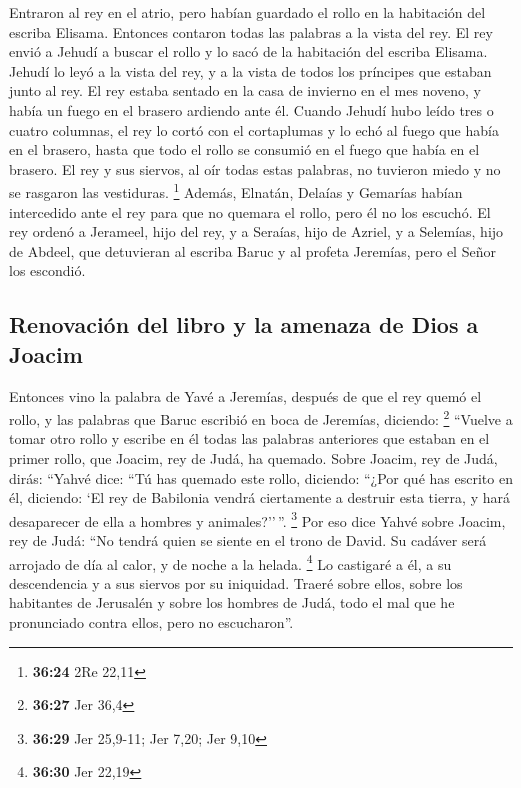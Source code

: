  Entraron al rey en el atrio, pero habían guardado el
rollo en la habitación del escriba Elisama. Entonces contaron todas las
palabras a la vista del rey.  El rey envió a Jehudí a
buscar el rollo y lo sacó de la habitación del escriba Elisama. Jehudí
lo leyó a la vista del rey, y a la vista de todos los príncipes que
estaban junto al rey.  El rey estaba sentado en la casa
de invierno en el mes noveno, y había un fuego en el brasero ardiendo
ante él.  Cuando Jehudí hubo leído tres o cuatro
columnas, el rey lo cortó con el cortaplumas y lo echó al fuego que
había en el brasero, hasta que todo el rollo se consumió en el fuego que
había en el brasero.  El rey y sus siervos, al oír todas
estas palabras, no tuvieron miedo y no se rasgaron las vestiduras.
\footnote{\textbf{36:24} 2Re 22,11}  Además, Elnatán,
Delaías y Gemarías habían intercedido ante el rey para que no quemara el
rollo, pero él no los escuchó.  El rey ordenó a Jerameel,
hijo del rey, y a Seraías, hijo de Azriel, y a Selemías, hijo de Abdeel,
que detuvieran al escriba Baruc y al profeta Jeremías, pero el Señor los
escondió.

\hypertarget{renovaciuxf3n-del-libro-y-la-amenaza-de-dios-a-joacim}{%
\subsection{Renovación del libro y la amenaza de Dios a
Joacim}\label{renovaciuxf3n-del-libro-y-la-amenaza-de-dios-a-joacim}}

 Entonces vino la palabra de Yavé a Jeremías, después de
que el rey quemó el rollo, y las palabras que Baruc escribió en boca de
Jeremías, diciendo: \footnote{\textbf{36:27} Jer 36,4} 
``Vuelve a tomar otro rollo y escribe en él todas las palabras
anteriores que estaban en el primer rollo, que Joacim, rey de Judá, ha
quemado.  Sobre Joacim, rey de Judá, dirás: ``Yahvé dice:
``Tú has quemado este rollo, diciendo: ``¿Por qué has escrito en él,
diciendo: `El rey de Babilonia vendrá ciertamente a destruir esta
tierra, y hará desaparecer de ella a hombres y animales?''\,''.
\footnote{\textbf{36:29} Jer 25,9-11; Jer 7,20; Jer 9,10}
 Por eso dice Yahvé sobre Joacim, rey de Judá: ``No
tendrá quien se siente en el trono de David. Su cadáver será arrojado de
día al calor, y de noche a la helada. \footnote{\textbf{36:30} Jer 22,19}
 Lo castigaré a él, a su descendencia y a sus siervos por
su iniquidad. Traeré sobre ellos, sobre los habitantes de Jerusalén y
sobre los hombres de Judá, todo el mal que he pronunciado contra ellos,
pero no escucharon''.

